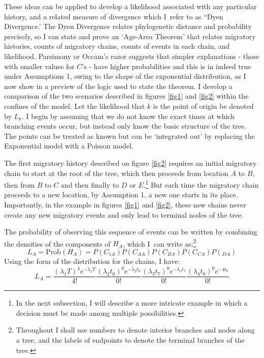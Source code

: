 \documentclass[11pt]{article}
\begin{document}
These ideas can be applied to develop a likelihood associated with any particular history, and a related measure of divergence which I\ refer to as ``Dyen Divergence.' The Dyen Divergence relates phylogenetic distance and probability precisely, so I  can state and prove an `Age-Area Theorem' that relates  migratory histories, counts of migratory chains, counts of events in each chain, and likelihood. Parsimony or Occam's razor suggests that simpler explanations - those with smaller values for $C$'s - have higher probabilities and this is in indeed true under Assumptions 1, owing to the shape of the exponential distribution, as I now show in a preview of the logic used to state the theorem.
 I  develop a comparison of the two scenarios described in figures \ref{fig1} and \ref{fig2} within the confines of the model. Let the likelihood that $k$ is the point of origin be denoted by $L_k$. I begin by assuming that we do not know the exact times at which branching events occur, but instead only know the basic structure of the tree. The points can be treated as known but can be `integrated out' by replacing the Exponential model with a Poisson model. 

The first migratory history described on figure \ref{fig2} requires an initial migratory chain to start at the root of the tree, which then proceeds from location $A$ to $B$, then from $B$ to $C$ and then finally to $D$ or $E$.\footnote{In the next subsection, I will describe a more intricate example in which a decision must be made among multiple possibilities.} But each time the migratory chain proceeds to a new location, by Assumption 1, a new one starts in its place. Importantly, in the example in figures \ref{fig1} and \ref{fig2}, these new chains never create any new migratory events and only lead to terminal nodes of the tree. 

The probability of observing this sequence of events can be written by combining the densities of the components of  $H_A$, which I\ can write as:\footnote{Throughout I shall use numbers to denote interior branches and nodes along a tree, and the labels of endpoints to denote the terminal branches of the tree.}
\begin{equation*}
L_A=\textrm{Prob}(H_A)=P(C_{1A})P(C_{AA})P(C_{BA})P(C_{CA})P(_{DA})
\end{equation*}
Using the form of the distribution for the chains, I have:
\begin{equation} \label{e1}
L_A = \frac{(\lambda_1 T)^4e^{-\lambda_1T}}{4!}\frac{(\lambda_2 t_6)^0e^{-\lambda_2t_6}}{0!}\frac{(\lambda_3 t_7)^0e^{-\lambda_3t_7}}{0!}\frac{(\lambda_4 t_8)^0e^{-4t_8}}{0!}
\end{equation} 
\end{document}
